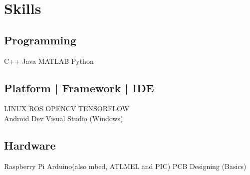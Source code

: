 \documentclass[]{resume-openfont}
\begin{document}
\begin{minipage}[t]{0.36\textwidth}
\section{Skills}
\subsection{Programming}
C++ \textbullet{}  Java \textbullet{} MATLAB \textbullet{} Python \\
\sectionsep
\subsection{Platform | Framework | IDE}
LINUX \textbullet{} ROS \textbullet{} OPENCV \textbullet{} TENSORFLOW\\
\textbullet{} Android Dev \textbullet{} Visual Studio (Windows)\\
\sectionsep
\subsection{Hardware}
Raspberry Pi \textbullet{} Arduino(also mbed, ATLMEL and PIC)  \textbullet{} PCB Designing (Basics)  


%
%

\end{minipage} 
\hfill
\end{document}
